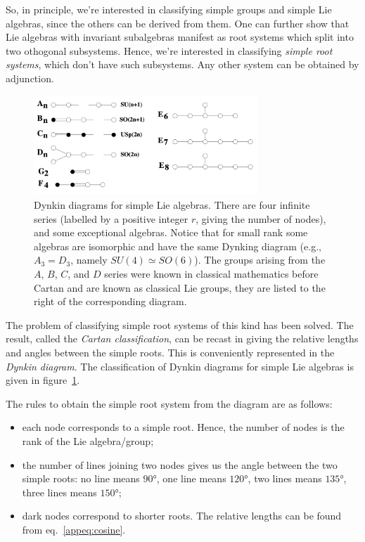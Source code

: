 So, in principle, we're interested in classifying simple groups and simple Lie algebras, since the others can be derived from them. One can further show that Lie algebras with invariant subalgebras manifest as root systems which split into two othogonal subsystems. Hence, we're interested in classifying \emph{simple root systems}, which don't have such subsystems. Any other system can be obtained by adjunction. 

\begin{figure}
    \centering
    \includegraphics[width=0.75\textwidth]{figures/dynkin.png}
    \caption{Dynkin diagrams for simple Lie algebras. There are four infinite series (labelled by a positive integer $r$, giving the number of nodes), and some exceptional algebras. Notice that for small rank some algebras are isomorphic and have the same Dynking diagram (e.g., $A_3 = D_3$, namely $SU(4) \simeq SO(6)$). The groups arising from the $A$, $B$, $C$, and $D$ series were known in classical mathematics before Cartan and are known as classical Lie groups, they are listed to the right of the corresponding diagram.}
    \label{fig:dynkin}
\end{figure}

The problem of classifying simple root systems of this kind has been solved. The result, called the \emph{Cartan classification}, can be recast in giving the relative lengths and angles between the simple roots. This is conveniently represented in the \emph{Dynkin diagram}. The classification of Dynkin diagrams for simple Lie algebras is given in figure~\ref{fig:dynkin}. 

The rules to obtain the simple root system from the diagram are as follows:
\begin{itemize}
    \item each node corresponds to a simple root. Hence, the number of nodes is the rank of the Lie algebra/group;
    \item the number of lines joining two nodes gives us the angle between the two simple roots: no line means $90$°, one line means $120$°, two lines means $135$°, three lines means $150$°;
    \item dark nodes correspond to shorter roots. The relative lengths can be found from eq.~\eqref{appeq:cosine}.
\end{itemize}

